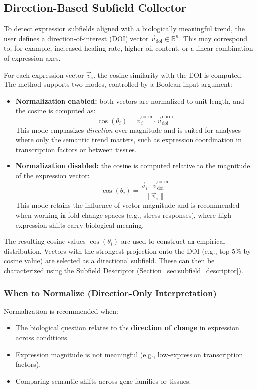 \documentclass{article}
\begin{document}
\subsection{Direction-Based Subfield Collector}
\label{sec:directional_collector}

To detect expression subfields aligned with a biologically meaningful trend, the user defines a direction-of-interest (DOI) vector \( \vec{v}_{\text{doi}} \in \mathbb{R}^n \). This may correspond to, for example, increased healing rate, higher oil content, or a linear combination of expression axes.

For each expression vector \( \vec{v}_i \), the cosine similarity with the DOI is computed. The method supports two modes, controlled by a Boolean input argument:

\begin{itemize}
    \item \textbf{Normalization enabled:} both vectors are normalized to unit length, and the cosine is computed as:
    \[
    \cos(\theta_i) = \vec{v}_i^{\text{norm}} \cdot \vec{v}_{\text{doi}}^{\text{norm}}
    \]
    This mode emphasizes \emph{direction} over magnitude and is suited for analyses where only the semantic trend matters, such as expression coordination in transcription factors or between tissues.

    \item \textbf{Normalization disabled:} the cosine is computed relative to the magnitude of the expression vector:
    \[
    \cos(\theta_i) = \frac{\vec{v}_i \cdot \vec{v}_{\text{doi}}^{\text{norm}}}{\|\vec{v}_i\|}
    \]
    This mode retains the influence of vector magnitude and is recommended when working in fold-change spaces (e.g., stress responses), where high expression shifts carry biological meaning.
\end{itemize}

The resulting cosine values \( \cos(\theta_i) \) are used to construct an empirical distribution. Vectors with the strongest projection onto the DOI (e.g., top 5\% by cosine value) are selected as a directional subfield. These can then be characterized using the Subfield Descriptor (Section~\ref{sec:subfield_descriptor}).

\subsubsection{When to Normalize (Direction-Only Interpretation)}

Normalization is recommended when:
\begin{itemize}
    \item The biological question relates to the \textbf{direction of change} in expression across conditions.
    \item Expression magnitude is not meaningful (e.g., low-expression transcription factors).
    \item Comparing semantic shifts across gene families or tissues.
\end{itemize}
\end{document}
